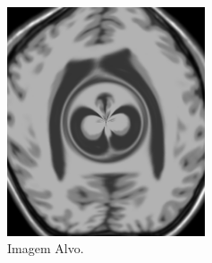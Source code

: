 \documentclass[t]{beamer}
\begin{document}
\begin{frame}
\begin{columns}[c]
\begin{figure}[!h]
\begin{center}
            \includegraphics[width=0.9\textwidth]{../images/movingImageSinDist.png}
            \caption{Imagem Alvo.}
          \end{center}
        \end{figure}
    \end{columns}
\end{frame}
\end{document}

